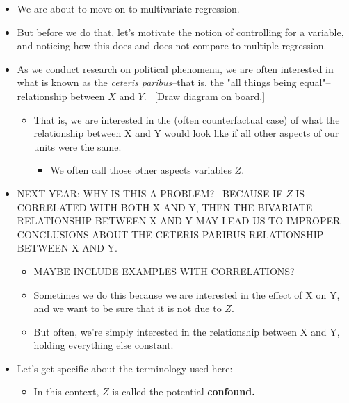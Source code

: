 \documentclass[11pt]{article}
\begin{document}
\begin{itemize}
\item We are about to move on to multivariate regression.

\item But before we do that, let's motivate the notion of controlling for a
variable, and noticing how this does and does not compare to multiple
regression.

\item As we conduct research on political phenomena, we are often interested
in what is known as the \textit{ceteris paribus}--that is, the "all things
being equal"--relationship between $X$ and $Y$. \ [Draw diagram on board.]

\begin{itemize}
\item That is, we are interested in the (often counterfactual case) of what
the relationship between X and Y would look like if all other aspects of our
units were the same.

\begin{itemize}
\item We often call those other aspects variables $Z$.
\end{itemize}
\end{itemize}

\item \lbrack NEXT YEAR: WHY IS THIS A PROBLEM? \ BECAUSE IF $Z$ IS
CORRELATED WITH BOTH X AND Y, THEN THE BIVARIATE RELATIONSHIP BETWEEN X AND
Y MAY LEAD US TO IMPROPER CONCLUSIONS ABOUT THE CETERIS PARIBUS RELATIONSHIP
BETWEEN X AND Y.

\begin{itemize}
\item MAYBE INCLUDE EXAMPLES WITH CORRELATIONS?

\item Sometimes we do this because we are interested in the effect of X on
Y, and we want to be sure that it is not due to $Z$.

\item But often, we're simply interested in the relationship between X and
Y, holding everything else constant.
\end{itemize}

\item Let's get specific about the terminology used here:

\begin{itemize}
\item In this context, $Z$ is called the potential \textbf{confound.}


\end{itemize}
\end{itemize}
\end{document}
